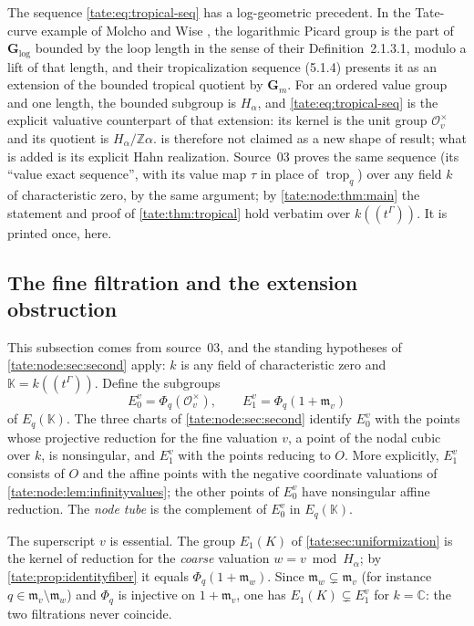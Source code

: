 \documentclass[11pt,letterpaper]{article}
\theoremstyle{definition}
\newcommand{\C}{\mathbb C}
\newcommand{\Z}{\mathbb Z}
\newcommand{\trop}{\operatorname{trop}}
\newcommand{\m}{\mathfrak m}
\newcommand{\OO}{\mathcal O}
\newcommand{\KK}{\mathbb K}
\begin{document}
The sequence \eqref{tate:eq:tropical-seq} has a log-geometric precedent.
In the Tate-curve example of Molcho and Wise \cite[\S5.1]{MW}, the
logarithmic Picard group is the part of $\mathbf G_{\log}$ bounded by the
loop length in the sense of their Definition~2.1.3.1, modulo a lift of that
length, and their tropicalization sequence (5.1.4) presents it as an
extension of the bounded tropical quotient by $\mathbf G_m$. For an ordered
value group and one length, the bounded subgroup is $H_\alpha$, and
\eqref{tate:eq:tropical-seq} is the explicit valuative counterpart of that
extension: its kernel is the unit group $\OO_v^\times$ and its quotient is
$H_\alpha/\Z\alpha$.  is therefore not claimed as a
new shape of result; what is added is its explicit Hahn realization.
Source~03 proves the same sequence (its ``value exact sequence'', with its
value map $\tau$ in place of $\trop_q$) over any field $k$ of characteristic
zero, by the same argument; by \cref{tate:node:thm:main} the statement and
proof of \cref{tate:thm:tropical} hold verbatim over $k((t^\Gamma))$. It is
printed once, here.

\subsection{The fine filtration and the extension obstruction}
\label{tate:node:sec:filtration}

This subsection comes from source~03, and the standing hypotheses of
\cref{tate:node:sec:second} apply: $k$ is any field of characteristic zero
and $\KK=k((t^\Gamma))$. Define the subgroups
\[
 E^v_0=\Phi_q(\OO_v^\times),\qquad
 E^v_1=\Phi_q(1+\m_v)
\]
of $E_q(\KK)$. The three charts of \cref{tate:node:sec:second} identify
$E^v_0$ with the points whose projective reduction for the fine valuation
$v$, a point of the nodal cubic over $k$, is nonsingular, and $E^v_1$ with
the points reducing to $O$. More explicitly, $E^v_1$ consists of $O$ and the
affine points with the negative coordinate valuations of
\cref{tate:node:lem:infinityvalues}; the other points of $E^v_0$ have
nonsingular affine reduction. The \emph{node tube} is the complement of
$E^v_0$ in $E_q(\KK)$.

The superscript $v$ is essential. The group $E_1(K)$ of
\cref{tate:sec:uniformization} is the kernel of reduction for the
\emph{coarse} valuation $w=v\bmod H_\alpha$; by
\cref{tate:prop:identityfiber} it equals $\Phi_q(1+\m_w)$. Since
$\m_w\subsetneq\m_v$ (for instance $q\in\m_v\setminus\m_w$) and $\Phi_q$ is
injective on $1+\m_v$, one has $E_1(K)\subsetneq E^v_1$ for $k=\C$: the two
filtrations never coincide.
\end{document}
